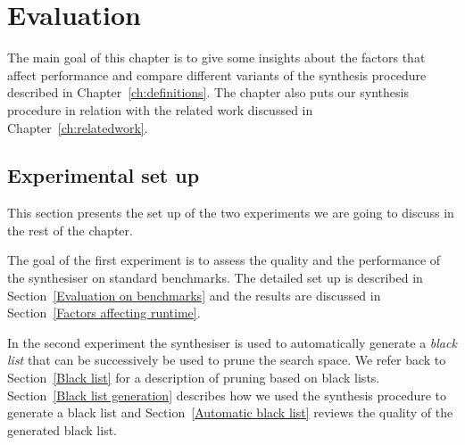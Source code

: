 \lstset{style=plain}

\chapter{Evaluation} \label{evaluation}

The main goal of this chapter is to give some insights about the factors that affect performance and compare different variants of the synthesis procedure described in Chapter~\ref{ch:definitions}. The chapter also puts our synthesis procedure in relation with the related work discussed in Chapter~\ref{ch:relatedwork}.


\section{Experimental set up}

This section presents the set up of the two experiments we are going to discuss in the rest of the chapter.

The goal of the first experiment is to assess the quality and the performance of the synthesiser on standard benchmarks. The detailed set up is described in Section~\ref{Evaluation on benchmarks} and the results are discussed in Section~\ref{Factors affecting runtime}.

In the second experiment the synthesiser is used to automatically generate a \emph{black list} that can be successively be used to prune the search space. We refer back to Section~\ref{Black list} for a description of pruning based on black lists. Section~\ref{Black list generation} describes how we used the synthesis procedure to generate a black list and Section~\ref{Automatic black list} reviews the quality of the generated black list.


